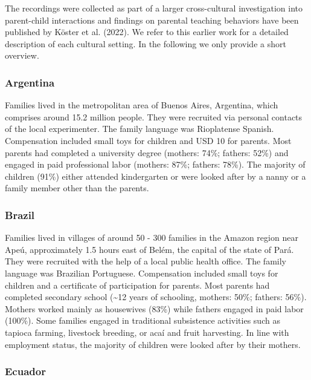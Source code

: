 \documentclass[
  man,floatsintext]{apa6}
\begin{document}
The recordings were collected as part of a larger cross-cultural investigation into parent-child interactions and findings on parental teaching behaviors have been published by Köster et al. (2022). We refer to this earlier work for a detailed description of each cultural setting. In the following we only provide a short overview.

\hypertarget{argentina}{%
\subsubsection{Argentina}\label{argentina}}

Families lived in the metropolitan area of Buenos Aires, Argentina, which comprises around 15.2 million people. They were recruited via personal contacts of the local experimenter. The family language was Rioplatense Spanish. Compensation included small toys for children and USD 10 for parents. Most parents had completed a university degree (mothers: 74\%; fathers: 52\%) and engaged in paid professional labor (mothers: 87\%; fathers: 78\%). The majority of children (91\%) either attended kindergarten or were looked after by a nanny or a family member other than the parents.

\hypertarget{brazil}{%
\subsubsection{Brazil}\label{brazil}}

Families lived in villages of around 50 - 300 families in the Amazon region near Apeú, approximately 1.5 hours east of Belém, the capital of the state of Pará. They were recruited with the help of a local public health office. The family language was Brazilian Portuguese. Compensation included small toys for children and a certificate of participation for parents. Most parents had completed secondary school (\textasciitilde12 years of schooling, mothers: 50\%; fathers: 56\%). Mothers worked mainly as housewives (83\%) while fathers engaged in paid labor (100\%). Some families engaged in traditional subsistence activities such as tapioca farming, livestock breeding, or acaí and fruit harvesting. In line with employment status, the majority of children were looked after by their mothers.

\hypertarget{ecuador}{%
\subsubsection{Ecuador}\label{ecuador}}
\end{document}
